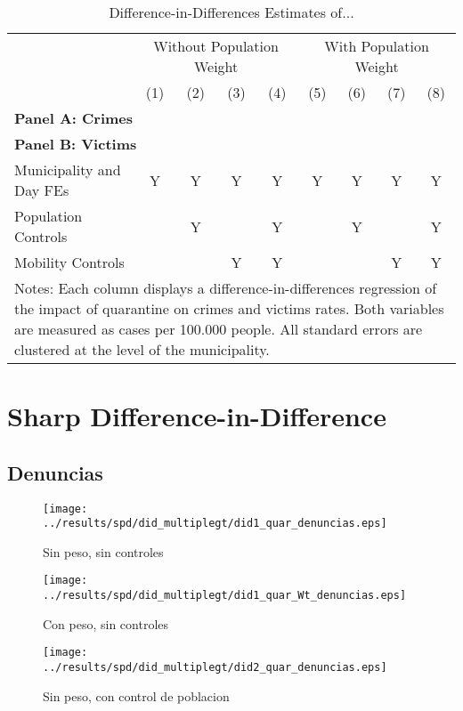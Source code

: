 \documentclass[11pt,letterpaper]{article}
\begin{document}
\begin{landscape}
  \begin{table}
    \centering
    \caption{Difference-in-Differences Estimates of...} \label{tab:DD}
    \begin{tabular}{lcccccccc} \toprule
      &\multicolumn{4}{c}{Without Population Weight}&\multicolumn{4}{c}{With Population Weight} \\ 
      \cmidrule(r){2-5}\cmidrule(r){6-9}
      &(1)&(2)&(3)&(4)&(5)&(6)&(7)&(8) \\ \midrule
      \multicolumn{9}{l}{\textbf{Panel A: Crimes}} \\
       \midrule
      \multicolumn{9}{l}{\textbf{Panel B: Victims}} \\
      
      \midrule
      Municipality and Day FEs &Y&Y&Y&Y&Y&Y&Y&Y \\
      Population Controls      & &Y& &Y& &Y& &Y \\
      Mobility Controls        & & &Y&Y& & &Y&Y \\
      \bottomrule
      \multicolumn{9}{p{21.8cm}}{{\footnotesize Notes: Each column displays a difference-in-differences regression of the impact of quarantine on crimes and victims rates. Both variables are measured as cases per 100.000 people.  All standard errors are clustered at the level of the municipality.}}
    \end{tabular}
  \end{table}
\end{landscape}

\section{Sharp Difference-in-Difference}
	\subsection{Denuncias}
\begin{figure}[H]
\caption{Sin peso, sin controles}
\centering
\texttt{[image: ../results/spd/did\_multiplegt/did1\_quar\_denuncias.eps]}
\end{figure}

\begin{figure}[H]
\caption{Con peso, sin controles}
\centering
\texttt{[image: ../results/spd/did\_multiplegt/did1\_quar\_Wt\_denuncias.eps]}
\end{figure}
\begin{figure}[H]
\caption{Sin peso, con control de poblacion}
\centering
\texttt{[image: ../results/spd/did\_multiplegt/did2\_quar\_denuncias.eps]}
\end{figure}
\end{document}
